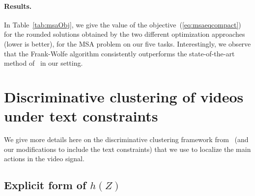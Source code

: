 \documentclass[10pt,twocolumn,letterpaper]{article}
\begin{document}
\paragraph{Results.} In Table~\ref{tab:msaObj}, we give the value of the objective~(\ref{eq:msaeqcompact}) for the rounded solutions obtained by the two different optimization approaches (lower is better), for the MSA problem on our
five tasks.
Interestingly, we observe that the Frank-Wolfe algorithm consistently outperforms the state-of-the-art method of~\cite{Lee01poa} in our setting.


\section{Discriminative clustering of videos under text constraints }
\label{sec:details_diffrac}

We give more details here on the discriminative clustering
framework from~\cite{Bojanowski14weakly,Bojanowski15weakly}
(and our modifications to include the text constraints) that we use
to localize the main actions in the video signal.

\subsection{Explicit form of $h(Z)$}
\label{subsec:explicit_h}
\end{document}

